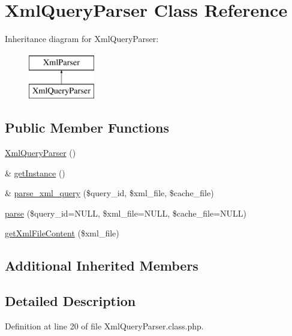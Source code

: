\hypertarget{classXmlQueryParser}{\section{Xml\-Query\-Parser Class Reference}
\label{classXmlQueryParser}
}
Inheritance diagram for Xml\-Query\-Parser\-:\begin{figure}[H]
\begin{center}
\leavevmode
\includegraphics[height=2.000000cm]{classXmlQueryParser}
\end{center}
\end{figure}
\subsection*{Public Member Functions}
\begin{DoxyCompactItemize}
\item 
\hyperlink{classXmlQueryParser_ac90d36a02cc74ea88d162d6fa0a44e21}{Xml\-Query\-Parser} ()
\item 
\& \hyperlink{classXmlQueryParser_af6558a14a48242f4082d4b05e24b66be}{get\-Instance} ()
\item 
\& \hyperlink{classXmlQueryParser_ada0b24aac541d493f8344a74776664cb}{parse\-\_\-xml\-\_\-query} (\$query\-\_\-id, \$xml\-\_\-file, \$cache\-\_\-file)
\item 
\hyperlink{classXmlQueryParser_a73bf00a88a856f3acb99dba3f554aeb2}{parse} (\$query\-\_\-id=N\-U\-L\-L, \$xml\-\_\-file=N\-U\-L\-L, \$cache\-\_\-file=N\-U\-L\-L)
\item 
\hyperlink{classXmlQueryParser_aed43fc81b117c0d90948cb70cdad6280}{get\-Xml\-File\-Content} (\$xml\-\_\-file)
\end{DoxyCompactItemize}
\subsection*{Additional Inherited Members}


\subsection{Detailed Description}


Definition at line 20 of file Xml\-Query\-Parser.\-class.\-php.




